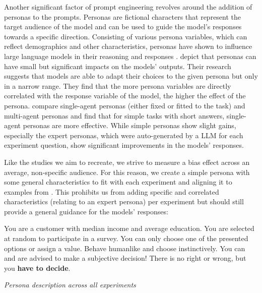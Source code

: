 \par Another significant factor of prompt engineering revolves around the addition of personas to the prompts. Personas are fictional characters that represent the target audience of the model and can be used to guide the model's responses towards a specific direction. Consisting of various persona variables, which can reflect demographics and other characteristics, personas have shown to influence large language models in their reasoning and responses \parencite{chen2023unleashing,hu2024quantifying,olea2024evaluating}. \textcite{hu2024quantifying} depict that personas can have small but significant impacts on the models' outputs. Their research suggests that models are able to adapt their choices to the given persona but only in a narrow range. They find that the more persona variables are directly correlated with the response variable of the model, the higher the effect of the persona. \textcite{olea2024evaluating} compare single-agent personas (either fixed or fitted to the task) and multi-agent personas and find that for simple tasks with short answers, single-agent personas are more effective. While simple personas show slight gains, especially the expert personas, which were auto-generated by a LLM for each experiment question, show significant improvements in the models' responses.

Like the studies we aim to recreate, we strive to measure a bias effect across an average, non-specific audience. For this reason, we create a simple persona with some general characteristics to fit with each experiment and aligning it to examples from \textcite{brand2023using}. This prohibits us from adding specific and correlated characteristics (relating to an expert persona) per experiment but should still provide a general guidance for the models' responses:
\begin{table}[ht]
    \begin{tcolorbox}[
        colframe=gray!90,    %
        colback=white,     %
        boxrule=0.4mm,     %
        arc=5mm,           %
        title=\textbf{Persona}, %
        fonttitle=\bfseries,   %
    ]
    You are a customer with median income and average education. You are selected at random to participate in a survey. You can only choose one of the presented options or assign a value. Behave humanlike and choose instinctively. You can and are advised to make a subjective decision! There is no right or wrong, but you \textbf{have to decide}.
    \end{tcolorbox}

    \caption[Persona description]{\textit{Persona description across all experiments}}
    \label{tab:persona-description}
    \centering
\end{table}

